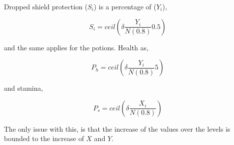 \noindent Dropped shield protection ($S_i$) is a percentage of ($Y_i$),

\begin{equation}
    S_i = ceil \left( \delta \frac{Y_i}{N(0.8)}0.5 \right)
\end{equation}

and the same applies for the potions. Health as,

\begin{equation}
    P_h = ceil \left( \delta \frac{Y_i}{N(0.8)}5 \right)
\end{equation}

and stamina,

\begin{equation}
    P_s = ceil \left( \delta \frac{X_i}{N(0.8)} \right)
\end{equation}

\noindent The only issue with this, is that the increase of the values over the levels is bounded to the increase of $X$ and $Y$.

